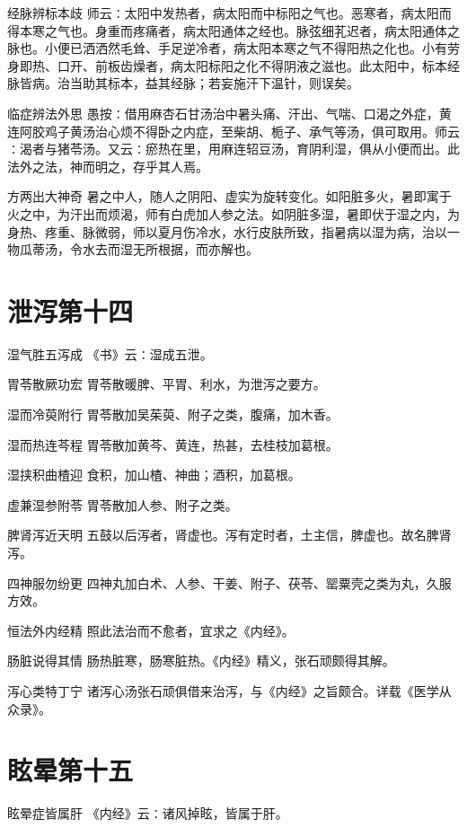 \documentclass[a4paper,12pt,UTF8,twoside]{ctexbook}
\begin{document}
    经脉辨标本歧
    师云∶太阳中发热者，病太阳而中标阳之气也。恶寒者，病太阳而得本寒之气也。身重而疼痛者，病太阳通体之经也。脉弦细芤迟者，病太阳通体之脉也。小便已洒洒然毛耸、手足逆冷者，病太阳本寒之气不得阳热之化也。小有劳身即热、口开、前板齿燥者，病太阳标阳之化不得阴液之滋也。此太阳中，标本经脉皆病。治当助其标本，益其经脉；若妄施汗下温针，则误矣。
    
    临症辨法外思
    愚按∶借用麻杏石甘汤治中暑头痛、汗出、气喘、口渴之外症，黄连阿胶鸡子黄汤治心烦不得卧之内症，至柴胡、栀子、承气等汤，俱可取用。师云∶渴者与猪苓汤。又云∶瘀热在里，用麻连轺豆汤，育阴利湿，俱从小便而出。此法外之法，神而明之，存乎其人焉。
    
    方两出大神奇
    暑之中人，随人之阴阳、虚实为旋转变化。如阳脏多火，暑即寓于火之中，为汗出而烦渴，师有白虎加人参之法。如阴脏多湿，暑即伏于湿之内，为身热、疼重、脉微弱，师以夏月伤冷水，水行皮肤所致，指暑病以湿为病，治以一物瓜蒂汤，令水去而湿无所根据，而亦解也。
    
    \chapter{泄泻第十四}
      湿气胜五泻成
    《书》云∶湿成五泄。
    
    胃苓散厥功宏
    胃苓散暖脾、平胃、利水，为泄泻之要方。
    
    湿而冷萸附行
    胃苓散加吴茱萸、附子之类，腹痛，加木香。
    
    湿而热连芩程
    胃苓散加黄芩、黄连，热甚，去桂枝加葛根。
    
    湿挟积曲楂迎
    食积，加山楂、神曲；酒积，加葛根。
    
    虚兼湿参附苓
    胃苓散加人参、附子之类。
    
    脾肾泻近天明
    五鼓以后泻者，肾虚也。泻有定时者，土主信，脾虚也。故名脾肾泻。
    
    四神服勿纷更
    四神丸加白术、人参、干姜、附子、茯苓、罂粟壳之类为丸，久服方效。
    
    恒法外内经精
    照此法治而不愈者，宜求之《内经》。
    
    肠脏说得其情
    肠热脏寒，肠寒脏热。《内经》精义，张石顽颇得其解。
    
    泻心类特丁宁
    诸泻心汤张石顽俱借来治泻，与《内经》之旨颇合。详载《医学从众录》。
    
    
    
    \chapter{眩晕第十五}
    眩晕症皆属肝
    《内经》云∶诸风掉眩，皆属于肝。
    
\end{document}
